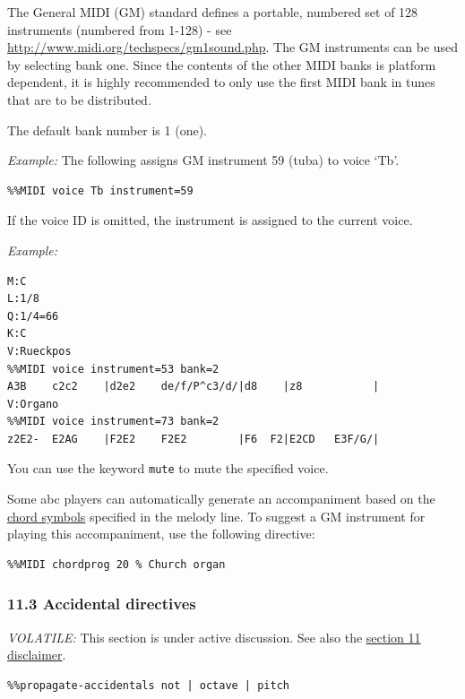 \documentclass[oneside]{book}
\begin{document}
The General MIDI (GM) standard defines a portable, numbered set of 128
instruments (numbered from 1-128) - see
\url{http://www.midi.org/techspecs/gm1sound.php}. The GM instruments can
be used by selecting bank one. Since the contents of the other MIDI
banks is platform dependent, it is highly recommended to only use the
first MIDI bank in tunes that are to be distributed.

The default bank number is 1 (one).

\emph{Example:} The following assigns GM instrument 59 (tuba) to voice
`Tb'.

\begin{verbatim}
%%MIDI voice Tb instrument=59
\end{verbatim}

If the voice ID is omitted, the instrument is assigned to the current
voice.

\emph{Example:}

\begin{verbatim}
M:C
L:1/8
Q:1/4=66
K:C
V:Rueckpos
%%MIDI voice instrument=53 bank=2
A3B    c2c2    |d2e2    de/f/P^c3/d/|d8    |z8           |
V:Organo
%%MIDI voice instrument=73 bank=2
z2E2-  E2AG    |F2E2    F2E2        |F6  F2|E2CD   E3F/G/|
\end{verbatim}

You can use the keyword \texttt{mute} to mute the specified voice.

Some abc players can automatically generate an accompaniment based on
the \protect\hyperlink{chord_symbols}{chord symbols} specified in the
melody line. To suggest a GM instrument for playing this accompaniment,
use the following directive:

\begin{verbatim}
%%MIDI chordprog 20 % Church organ
\end{verbatim}

\hypertarget{accidental_directives}{\subsubsection{11.3 Accidental
directives}\label{accidental_directives}}

\emph{VOLATILE:} This section is under active discussion. See also the
\protect\hyperlink{disclaimer}{section 11 disclaimer}.

\begin{verbatim}
%%propagate-accidentals not | octave | pitch
\end{verbatim}
\end{document}
